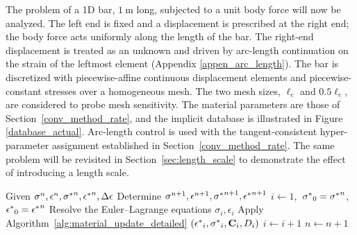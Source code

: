 \documentclass[10pt,review]{cas-sc}
\begin{document}
The problem of a 1D bar, $\SI{1}{\meter}$ long, subjected to a unit body force will now be analyzed. The left end is fixed and a displacement is prescribed at the right end; the body force acts uniformly along the length of the bar. The right-end displacement is treated as an unknown and driven by arc-length continuation on the strain of the leftmost element (Appendix \ref{appen_arc_length}). The bar is discretized with piecewise-affine continuous displacement elements and piecewise-constant stresses over a homogeneous mesh. The two mesh sizes, $\ell_e$ and $0.5 \ell_e$, are considered to probe mesh sensitivity. The material parameters are those of Section~\ref{conv_method_rate}, and the implicit database is illustrated in Figure \ref{database_actual}. Arc-length control is used with the tangent-consistent hyper-parameter assignment established in Section~\ref{conv_method_rate}. The same problem will be revisited in Section~\ref{sec:length_scale} to demonstrate the effect of introducing a length scale.


\begin{algorithm}
	\begin{algorithmic}
		\State Given $\sigma^n,\epsilon^n,\mbox{$\sigma^*$}^n,\mbox{$\epsilon^*$}^n,\Delta\epsilon$
		\State Determine $\sigma^{n+1},\epsilon^{n+1},\mbox{$\sigma^*$}^{n+1},\mbox{$\epsilon^*$}^{n+1}$
		\State $i\gets 1$,\ $\mbox{$\sigma^*$}_0=\mbox{$\sigma^*$}^n$,\ $\mbox{$\epsilon^*$}_0=\mbox{$\epsilon^*$}^n$
		\State Resolve the Euler--Lagrange equations
		\State \Return $\sigma_i,\epsilon_i$
		\EndProcedure
		\State Apply Algorithm~\ref{alg:material_update_detailed}
		\State \Return $(\mbox{$\epsilon^*$}_i,\mbox{$\sigma^*$}_i,\mathbf{C}_i,D_i)$
		\EndProcedure
		\State $i\gets i+1$
		\EndWhile
		\State $n\gets n+1$
	\end{algorithmic}
	\caption{The DD algorithm}\label{alg:the_dd_algorithm}
\end{algorithm}
\end{document}
